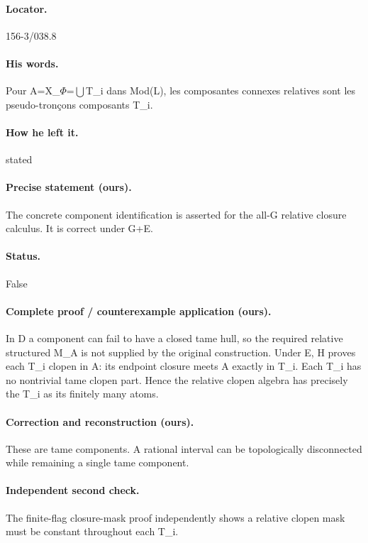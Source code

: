 \paragraph{Locator.} 156-3/038.8

\paragraph{His words.} Pour A=X\_\ensuremath{\Phi}=\ensuremath{\bigcup}T\_i dans Mod(L), les composantes connexes relatives sont les pseudo-tronçons composants T\_i.

\paragraph{How he left it.} stated

\paragraph{Precise statement (ours).} The concrete component identification is asserted for the all-G relative closure calculus. It is correct under G+E.

\paragraph{Status.} False

\paragraph{Complete proof / counterexample application (ours).} In D a component can fail to have a closed tame hull, so the required relative structured M\_A is not supplied by the original construction. Under E, H proves each T\_i clopen in A: its endpoint closure meets A exactly in T\_i. Each T\_i has no nontrivial tame clopen part. Hence the relative clopen algebra has precisely the T\_i as its finitely many atoms.

\paragraph{Correction and reconstruction (ours).} These are tame components. A rational interval can be topologically disconnected while remaining a single tame component.

\paragraph{Independent second check.} The finite-flag closure-mask proof independently shows a relative clopen mask must be constant throughout each T\_i.

